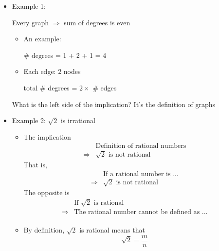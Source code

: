 \begin{frame}[allowframebreaks]
\begin{itemize}
  \item Example 1:

Every graph $\Rightarrow$ sum of degrees is even
\begin{itemize}
\item An example:
    \begin{center}
\end{center}
\# degrees = 1 + 2 + 1 = 4
\item Each edge: 2 nodes
  \begin{center}
total \# degrees = $2\times $ \# edges
\end{center}
\end{itemize}
What is the left side of the implication? It's the definition of graphs
\item Example 2: $\sqrt{2}$ is irrational
  \begin{itemize}
  \item The implication
    \begin{equation*}
      \begin{split}
&   \text{Definition of rational numbers}\\
\Rightarrow&  \sqrt{2} \text{ is not rational}
\end{split}
\end{equation*}
That is,
    \begin{equation*}
      \begin{split}
&   \text{If a rational number is ...}\\
\Rightarrow&  \sqrt{2} \text{ is not rational}
\end{split}
\end{equation*}
The opposite is
    \begin{equation*}
      \begin{split}
        &  \text{If $\sqrt{2}$ is rational}
\\
\Rightarrow& \text{The rational number cannot be defined as ...}\\
\end{split}
\end{equation*}
  \item By definition, $\sqrt{2}$ is rational means that
    \begin{equation*}
      \sqrt{2}=\frac{m}{n}

\end{equation*}
\end{itemize}
\end{itemize}
\end{frame}
